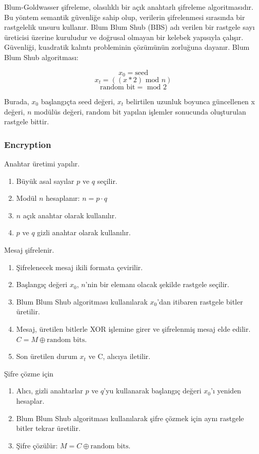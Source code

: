Blum-Goldwasser şifreleme, olasılıklı bir açık anahtarlı şifreleme algoritmasıdır. Bu yöntem semantik güvenliğe sahip olup, verilerin şifrelenmesi sırasında bir rastgelelik unsuru kullanır. Blum Blum Shub (BBS) adı verilen bir rastgele sayı üreticisi üzerine kuruludur ve doğrusal olmayan bir kelebek yapısıyla çalışır. Güvenliği, kuadratik kalıntı probleminin çözümünün zorluğuna dayanır. Blum Blum Shub algoritması:

\[ x_0 = \text{seed} \]
\[ x_t = ((x * 2) \text{ mod } n) \]
\[ \text{random bit} = \text{ mod } 2 \]

Burada, $x_0$ başlangıçta seed değeri, $x_t$ belirtilen uzunluk boyunca güncellenen x değeri, $n$ modülüs değeri, $\text{random bit}$ yapılan işlemler sonucunda oluşturulan rastgele bittir.

\subsubsection{Encryption}

Anahtar üretimi yapılır.

\begin{enumerate}
    \item Büyük asal sayılar $p$ ve $q$ seçilir.
    \item Modül $n$ hesaplanır: $n = p \cdot q$
    \item $n$ açık anahtar olarak kullanılır.
    \item $p$ ve $q$ gizli anahtar olarak kullanılır.
\end{enumerate}

Mesaj şifrelenir.

\begin{enumerate}
    \item Şifrelenecek mesaj ikili formata çevirilir.
    \item Başlangıç değeri $x_0$, $n$'nin bir elemanı olacak şekilde rastgele seçilir.
    \item Blum Blum Shub algoritması kullanılarak $x_0$'dan itibaren rastgele bitler üretilir.
    \item Mesaj, üretilen bitlerle XOR işlemine girer ve şifrelenmiş mesaj elde edilir. $C = M \oplus \text{random bits}$.
    \item Son üretilen durum $x_t$ ve C, alıcıya iletilir.
\end{enumerate}

Şifre çözme için

\begin{enumerate}
    \item Alıcı, gizli anahtarlar $p$ ve $q$'yu kullanarak başlangıç değeri $x_0$'ı yeniden hesaplar.
    \item Blum Blum Shub algoritması kullanılarak şifre çözmek için aynı rastgele bitler tekrar üretilir.
    \item Şifre çözülür: $M = C \oplus \text{random bits}$.
\end{enumerate}

